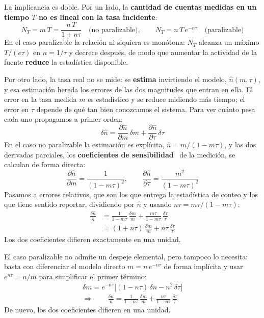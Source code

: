 La implicancia es doble. Por un lado, la \textbf{cantidad de cuentas medidas en
un tiempo $T$ no es lineal con la tasa incidente}:
\begin{equation}
  N_T = m\,T = \frac{n\,T}{1+n\tau}\quad\text{(no paralizable)},\qquad
  N_T = n\,T\,e^{-n\tau}\quad\text{(paralizable)}
  \label{e:mca-cuentas}
\end{equation}
En el caso paralizable la relación ni siquiera es monótona: $N_T$ alcanza un
máximo $T/(e\tau)$ en $n = 1/\tau$ y decrece después, de modo que aumentar la
actividad de la fuente \textbf{reduce} la estadística disponible.

Por otro lado, la tasa real no se mide: se \textbf{estima} invirtiendo el
modelo, $\hat n(m, \tau)$, y esa estimación hereda los errores de las dos
magnitudes que entran en ella. El error en la tasa medida $m$ es estadístico y
se reduce midiendo más tiempo; el error en $\tau$ depende de qué tan bien
conozcamos el sistema. Para ver cuánto pesa cada uno propagamos a primer orden:
\begin{equation}
  \delta \hat n = \frac{\partial \hat n}{\partial m}\,\delta m
                + \frac{\partial \hat n}{\partial \tau}\,\delta \tau
  \label{e:mca-propagacion}
\end{equation}
En el caso no paralizable la estimación es explícita, $\hat n = m/(1-m\tau)$, y
las dos derivadas parciales, los \textbf{coeficientes de
sensibilidad}~\cite{GUM2008} de la medición, se calculan de forma directa:
\begin{equation}
  \frac{\partial \hat n}{\partial m} = \frac{1}{(1-m\tau)^2}, \qquad
  \frac{\partial \hat n}{\partial \tau} = \frac{m^2}{(1-m\tau)^2}
  \label{e:mca-sensibilidad-np}
\end{equation}
Pasamos a errores relativos, que son los que entrega la estadística de conteo y
los que tiene sentido reportar, dividiendo por $\hat n$ y usando
$n\tau = m\tau/(1-m\tau)$:
\begin{equation}
  \begin{split}
  \frac{\delta \hat n}{\hat n}
    &= \frac{1}{1-m\tau}\,\frac{\delta m}{m}
     + \frac{m\tau}{1-m\tau}\,\frac{\delta \tau}{\tau} \\
    &= (1+n\tau)\,\frac{\delta m}{m} + n\tau\,\frac{\delta \tau}{\tau}
  \end{split}
  \label{e:mca-relativo-np}
\end{equation}
Los dos coeficientes difieren exactamente en una unidad.

El caso paralizable no admite un despeje elemental, pero tampoco lo necesita:
basta con diferenciar el modelo directo $m = n\,e^{-n\tau}$ de forma implícita y
usar $e^{n\tau} = n/m$ para simplificar el primer término:
\begin{equation}
  \begin{gathered}
  \delta m = e^{-n\tau}\Big[(1-n\tau)\,\delta n - n^2\,\delta \tau\Big] \\
  \Longrightarrow\qquad
  \frac{\delta n}{n} = \frac{1}{1-n\tau}\,\frac{\delta m}{m}
                     + \frac{n\tau}{1-n\tau}\,\frac{\delta \tau}{\tau}
  \end{gathered}
  \label{e:mca-relativo-p}
\end{equation}
De nuevo, los dos coeficientes difieren en una unidad.

